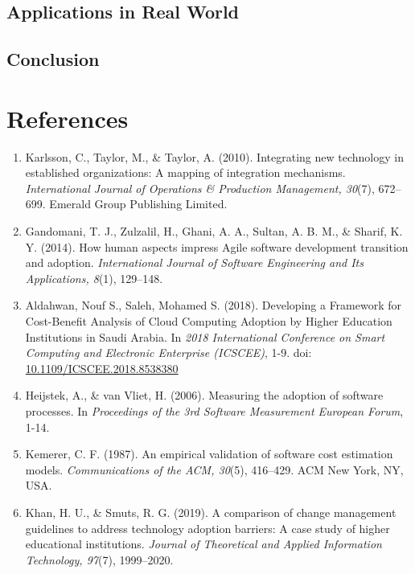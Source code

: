 \documentclass{article}
\begin{document}
\subsection{Applications in Real World}
\lipsum[27]

\subsection{Conclusion}
\lipsum[28]

\section{References}
\begin{enumerate}
    \item Karlsson, C., Taylor, M., \& Taylor, A. (2010). Integrating new technology in established organizations: A mapping of integration mechanisms. \textit{International Journal of Operations \& Production Management, 30}(7), 672--699. Emerald Group Publishing Limited.
  
    \item Gandomani, T. J., Zulzalil, H., Ghani, A. A., Sultan, A. B. M., \& Sharif, K. Y. (2014). How human aspects impress Agile software development transition and adoption. \textit{International Journal of Software Engineering and Its Applications, 8}(1), 129--148.

    \item Aldahwan, Nouf S., Saleh, Mohamed S. (2018). Developing a Framework for Cost-Benefit Analysis of Cloud Computing Adoption by Higher Education Institutions in Saudi Arabia. In \textit{2018 International Conference on Smart Computing and Electronic Enterprise (ICSCEE)}, 1-9. doi: \url{10.1109/ICSCEE.2018.8538380}

    \item Heijstek, A., \& van Vliet, H. (2006). Measuring the adoption of software processes. In \textit{Proceedings of the 3rd Software Measurement European Forum}, 1-14. 

    \item Kemerer, C. F. (1987). An empirical validation of software cost estimation models. \textit{Communications of the ACM, 30}(5), 416--429. ACM New York, NY, USA.

    \item Khan, H. U., \& Smuts, R. G. (2019). A comparison of change management guidelines to address technology adoption barriers: A case study of higher educational institutions. \textit{Journal of Theoretical and Applied Information Technology, 97}(7), 1999--2020.


\end{enumerate}
\end{document}
